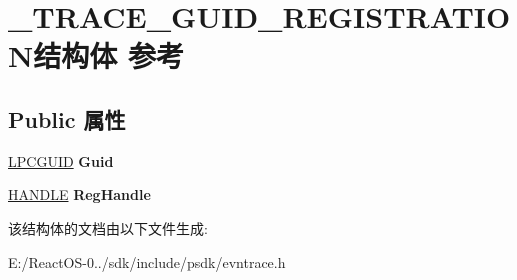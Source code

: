 \hypertarget{struct___t_r_a_c_e___g_u_i_d___r_e_g_i_s_t_r_a_t_i_o_n}{}\section{\+\_\+\+T\+R\+A\+C\+E\+\_\+\+G\+U\+I\+D\+\_\+\+R\+E\+G\+I\+S\+T\+R\+A\+T\+I\+O\+N结构体 参考}
\label{struct___t_r_a_c_e___g_u_i_d___r_e_g_i_s_t_r_a_t_i_o_n}
\subsection*{Public 属性}
\begin{DoxyCompactItemize}
\item 
\mbox{\label{struct___t_r_a_c_e___g_u_i_d___r_e_g_i_s_t_r_a_t_i_o_n_a2d7ee83b847c239b5b3f8311fe4a9059}} 
\hyperlink{interface_g_u_i_d}{L\+P\+C\+G\+U\+ID} {\bfseries Guid}
\item 
\mbox{\label{struct___t_r_a_c_e___g_u_i_d___r_e_g_i_s_t_r_a_t_i_o_n_afe7bd716fe61fa4cc4855f1df718c012}} 
\hyperlink{interfacevoid}{H\+A\+N\+D\+LE} {\bfseries Reg\+Handle}
\end{DoxyCompactItemize}


该结构体的文档由以下文件生成\+:\begin{DoxyCompactItemize}
\item 
E\+:/\+React\+O\+S-\/0../sdk/include/psdk/evntrace.\+h\end{DoxyCompactItemize}
